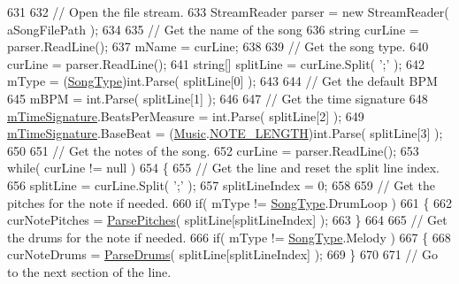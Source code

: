 \begin{DoxyCodeInclude}
631 
632         \textcolor{comment}{// Open the file stream.}
633         StreamReader parser = \textcolor{keyword}{new} StreamReader( aSongFilePath );
634 
635         \textcolor{comment}{// Get the name of the song}
636         \textcolor{keywordtype}{string} curLine = parser.ReadLine();
637         mName = curLine;
638 
639         \textcolor{comment}{// Get the song type.}
640         curLine = parser.ReadLine();
641         \textcolor{keywordtype}{string}[] splitLine = curLine.Split( \textcolor{charliteral}{';'} );
642         mType = (\hyperlink{group___song_enums_gae681a1f001333e39fc1cb4fea97bfe1b}{SongType})\textcolor{keywordtype}{int}.Parse( splitLine[0] );
643 
644         \textcolor{comment}{// Get the default BPM}
645         mBPM = \textcolor{keywordtype}{int}.Parse( splitLine[1] );
646 
647         \textcolor{comment}{// Get the time signature}
648         \hyperlink{group___song_priv_var_ga2b2dcc0e83e49f7303b6a1371877b25e}{mTimeSignature}.BeatsPerMeasure = \textcolor{keywordtype}{int}.Parse( splitLine[2] );
649         \hyperlink{group___song_priv_var_ga2b2dcc0e83e49f7303b6a1371877b25e}{mTimeSignature}.BaseBeat = (\hyperlink{class_music}{Music}.\hyperlink{group___music_enums_gaf11b5f079adbb21c800b9eca1c5c3cbd}{NOTE\_LENGTH})\textcolor{keywordtype}{int}.Parse( splitLine[3] 
      );
650 
651         \textcolor{comment}{// Get the notes of the song.}
652         curLine = parser.ReadLine();
653         \textcolor{keywordflow}{while}( curLine != null )
654         \{
655             \textcolor{comment}{// Get the line and reset the split line index.}
656             splitLine = curLine.Split( \textcolor{charliteral}{';'} );
657             splitLineIndex = 0;
658 
659             \textcolor{comment}{// Get the pitches for the note if needed.}
660             \textcolor{keywordflow}{if}( mType != \hyperlink{group___song_enums_gae681a1f001333e39fc1cb4fea97bfe1b}{SongType}.DrumLoop )
661             \{
662                 curNotePitches = \hyperlink{group___song_priv_func_gacf6fee93921e1a5edbc477c0898c357a}{ParsePitches}( splitLine[splitLineIndex] );
663             \}
664 
665             \textcolor{comment}{// Get the drums for the note if needed.}
666             \textcolor{keywordflow}{if}( mType != \hyperlink{group___song_enums_gae681a1f001333e39fc1cb4fea97bfe1b}{SongType}.Melody )
667             \{
668                 curNoteDrums = \hyperlink{group___song_priv_func_gaaa4ca12f0885a34cbfb09bb7a1db178b}{ParseDrums}( splitLine[splitLineIndex] );
669             \}
670 
671             \textcolor{comment}{// Go to the next section of the line.}

\end{DoxyCodeInclude}
